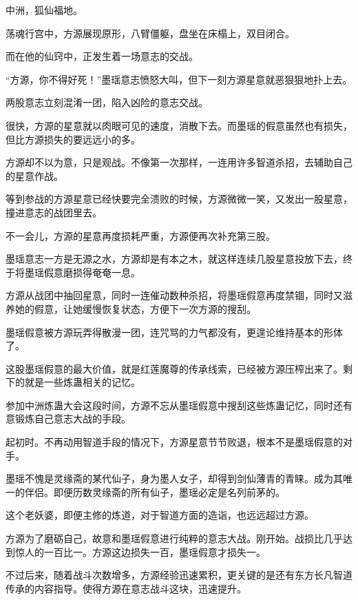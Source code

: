 
\begin{this_body}



中洲，狐仙福地。

荡魂行宫中，方源展现原形，八臂僵躯，盘坐在床榻上，双目闭合。

而在他的仙窍中，正发生着一场意志的交战。

“方源，你不得好死！”墨瑶意志愤怒大叫，但下一刻方源星意就恶狠狠地扑上去。

两股意志立刻混淆一团，陷入凶险的意志交战。

很快，方源的星意就以肉眼可见的速度，消散下去。而墨瑶的假意虽然也有损失，但比方源损失的要远远小的多。

方源却不以为意，只是观战。不像第一次那样，一连用许多智道杀招，去辅助自己的星意作战。

等到参战的方源星意已经快要完全溃败的时候，方源微微一笑，又发出一股星意，撞进意志的战团里去。

不一会儿，方源的星意再度损耗严重，方源便再次补充第三股。

墨瑶意志一方是无源之水，方源却是有本之木，就这样连续几股星意投放下去，终于将墨瑶假意磨损得奄奄一息。

方源从战团中抽回星意，同时一连催动数种杀招，将墨瑶假意再度禁锢，同时又滋养她的假意，让她缓慢恢复状态，方便下一次方源的搜刮。

墨瑶假意被方源玩弄得散漫一团，连咒骂的力气都没有，更遑论维持基本的形体了。

这股墨瑶假意的最大价值，就是红莲魔尊的传承线索，已经被方源压榨出来了。剩下的就是一些炼蛊相关的记忆。

参加中洲炼蛊大会这段时间，方源不忘从墨瑶假意中搜刮这些炼蛊记忆，同时还有意锻炼自己意志大战的手段。

起初时。不再动用智道手段的情况下，方源星意节节败退，根本不是墨瑶假意的对手。

墨瑶不愧是灵缘斋的某代仙子，身为墨人女子，却得到剑仙薄青的青睐。成为其唯一的伴侣。即便历数灵缘斋的所有仙子，墨瑶必定是名列前茅的。

这个老妖婆，即便主修的炼道，对于智道方面的造诣，也远远超过方源。

方源为了磨砺自己，故意和墨瑶假意进行纯粹的意志大战。刚开始。战损比几乎达到惊人的一百比一。方源这边损失一百，墨瑶假意才损失一。

不过后来，随着战斗次数增多，方源经验迅速累积，更关键的是还有东方长凡智道传承的内容指导。使得方源在意志战斗这块，迅速提升。


\end{this_body}
